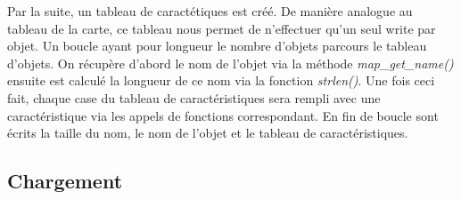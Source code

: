 \documentclass[10pt,a4paper]{article}
\begin{document}
	Par la suite, un tableau de caractétiques est créé. De manière analogue au tableau de la carte, ce tableau nous permet de n'effectuer qu'un seul write par objet. Un boucle ayant pour longueur le nombre d'objets parcours le tableau d'objets. On récupère d'abord le nom de l'objet via la méthode \textit{map\_get\_name()} ensuite est calculé la longueur de ce nom via la fonction \textit{strlen()}. Une fois ceci fait, chaque case du tableau de caractéristiques sera rempli avec une caractéristique via les appels de fonctions correspondant. En fin de boucle sont écrits la taille du nom, le nom de l'objet et le tableau de caractéristiques.
	
\subsection{Chargement}
\end{document}
